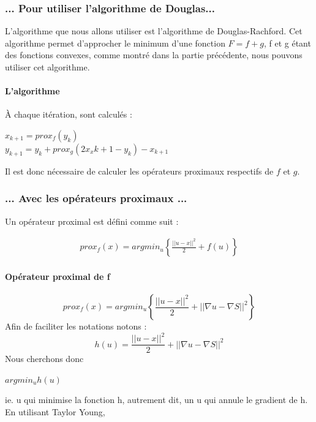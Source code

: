\subsubsection{... Pour utiliser l'algorithme de Douglas...}
L'algorithme que nous allons utiliser est l'algorithme de Douglas-Rachford. Cet algorithme permet d'approcher le minimum  d'une fonction $F = f+g$, f et g étant des fonctions convexes, comme montré dans la partie précédente, nous pouvons utiliser cet algorithme.
\paragraph{L'algorithme}
À chaque itération, sont calculés : 
\begin{center}
$x_{k+1} = prox_f(y_k)$\\
$y_{k+1} = y_k+prox_g(2x_x{k+1}-y_k)-x_{k+1}$
\end{center}{}
Il est donc nécessaire de calculer les opérateurs proximaux respectifs de $f$ et $g$. 
\subsubsection{... Avec les opérateurs proximaux ...}
Un opérateur proximal est défini comme suit : 
\begin{center}
\begin{equation*}
\begin{aligned}
prox_f(x) = argmin_u \left\{ \frac{||u-x||^2}{2}+ f(u)\right\}
\end{aligned}
\end{equation*}
\end{center}
\paragraph{Opérateur proximal de f}
\begin{equation*}
prox_f(x) = argmin_u\left\{\frac{||u-x||^2}{2}+||\nabla u -\nabla S ||^2 \right\}
\end{equation*}
Afin de faciliter les notations notons :
\begin{equation*}
h(u) = \frac{||u-x||^2}{2}+||\nabla u -\nabla S ||^2
\end{equation*} 
Nous cherchons donc 
\begin{center}
$argmin_u h(u)$
\end{center}
ie. u qui minimise la fonction h, autrement dit, un u qui annule le gradient de h.\\
En utilisant Taylor Young, 

